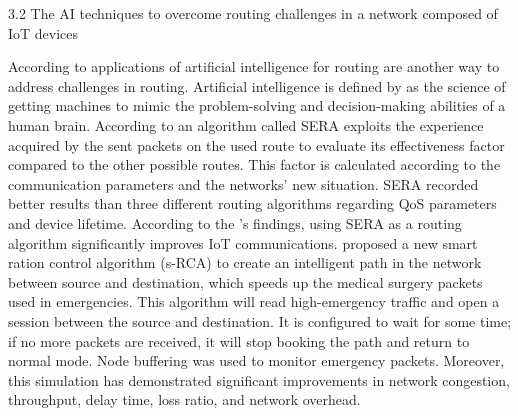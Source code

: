   3.2 The AI techniques to overcome routing challenges in a network composed of IoT devices 
  
According to \cite{Tlili-Sihem-Mnasri-Sami-Val-hierry:2022} applications of artificial intelligence for routing are another 
way to address challenges in routing. Artificial intelligence is defined by \cite{Dick2019Artificial:2019}
as the science of getting machines to mimic the problem-solving and decision-making abilities of a human brain. 
According to \cite{amrioui-Sofiane-Hamrioui-Camil-Lloret-Jaime-Lorenz-Pascal:2018} an algorithm called SERA exploits 
the experience acquired by the sent packets on the used route to evaluate its effectiveness factor compared to the other 
possible routes. This factor is calculated according to the communication parameters and the networks’ new situation. 
SERA recorded better results than three different routing algorithms regarding QoS parameters and device lifetime.
According to the \cite{amrioui-Sofiane-Hamrioui-Camil-Lloret-Jaime-Lorenz-Pascal:2018}'s findings, using SERA as a routing 
algorithm significantly improves IoT communications. \cite{bujassar-Radwan-Yaseen-Husam-Al-Adwan-Ahmad:2021} proposed a new smart 
ration control algorithm (s-RCA) to create an intelligent path in the network between source and destination, which speeds 
up the medical surgery packets used in emergencies. This algorithm will read high-emergency traffic and open a session between
 the source and destination. It is configured to wait for some time; if no more packets are received, it will stop booking the 
 path and return to normal mode. Node buffering was used to monitor emergency packets. Moreover, this simulation has demonstrated 
 significant improvements in network congestion, throughput, delay time, loss ratio, and network overhead. 
 
